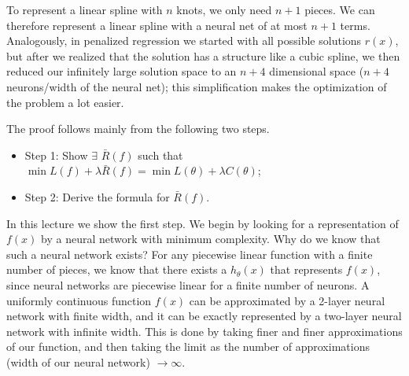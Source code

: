 To represent a linear spline with $n$ knots, we only need $n+1$ pieces. We can therefore represent a linear spline with a neural net of at most $n+1$ terms. Analogously, in penalized regression we started with all possible solutions $r(x)$, but after we realized that the solution has a structure like a cubic spline, we then reduced our infinitely large solution space to an $n+4$ dimensional space ($n+4$ neurons/width of the neural net); this simplification makes the optimization of the problem a lot easier. 

The proof follows mainly from the following two steps.
\begin{itemize}
\item Step 1: Show $ \exists$ $ \bar{R}(f)$ such that $\min L(f) + \lambda \bar{R}(f) = \min L(\theta) + \lambda C(\theta)$;
\item Step 2: Derive the formula for $\bar{R}(f)$.
\end{itemize}
In this lecture we show the first step. We begin by looking for a representation of $f(x)$ by a neural network with minimum complexity. 
Why do we know that such a neural network exists? For any piecewise linear function with a finite number of pieces, we know that there exists a $h_\theta(x)$ that represents $f(x)$, since neural networks are piecewise linear for a finite number of neurons. A uniformly continuous function $f(x)$ can be approximated by a 2-layer neural network with finite width, and it can be exactly represented by a two-layer neural network with infinite width. This is done by taking finer and finer approximations of our function, and then taking the limit as the number of approximations (width of our neural network) $\rightarrow \infty$.

